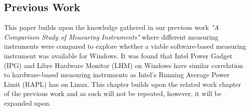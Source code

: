 \subsection{Previous Work}
This paper builds upon the knowledge gathered in our previous work \textit{"A Comparison Study of Measuring Instruments"}\cite{biksbois} where different measuring instruments were compared to explore whether a viable software-based measuring instrument was available for Windows. It was found that Intel Power Gadget (IPG) and Libre Hardware Monitor (LHM) on Windows have similar correlation to hardware-based measuring instruments as Intel's Running Average Power Limit (RAPL) has on Linux. This chapter builds upon the related work chapter of the previous work and as such will not be repeated, however, it will be expanded upon.
